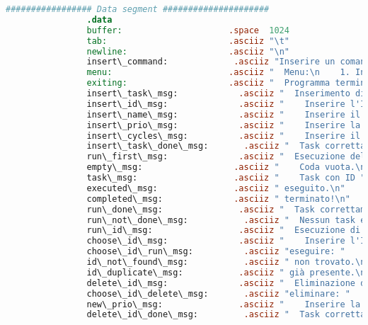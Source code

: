 \begin{center}
\begin{lstlisting}[language=mips, gobble=14, stepnumber=1]
                ################# Data segment #####################
                .data
                buffer:                     .space  1024
                tab:                        .asciiz "\t"
                newline:                    .asciiz "\n"
                insert\_command:             .asciiz "Inserire un comando (INVIO stampa il menu): "
                menu:                       .asciiz "  Menu:\n    1. Inserisci un nuovo task;\n    2. Esegui il task in testa alla coda;\n    3. Esegui un task specifico;\n    4. Elimina un task specifico;\n    5. Modifica la priorità di un task specifico;\n    6. Cambia politica di scheduling;\n    7. Termina il programma.\n\n"
                exiting:                    .asciiz "  Programma terminato."
                insert\_task\_msg:            .asciiz "  Inserimento di un nuovo task.\n"
                insert\_id\_msg:              .asciiz "    Inserire l'ID del task: "
                insert\_name\_msg:            .asciiz "    Inserire il nome del task (max 8 caratteri): "
                insert\_prio\_msg:            .asciiz "    Inserire la priorità del task (min 0, max 9): "
                insert\_cycles\_msg:          .asciiz "    Inserire il numero di cicli di CPU del task (min 1, max 99): "
                insert\_task\_done\_msg:       .asciiz "  Task correttamente inserito!\n\n"
                run\_first\_msg:              .asciiz "  Esecuzione del primo task.\n"
                empty\_msg:                  .asciiz "    Coda vuota.\n"
                task\_msg:                   .asciiz "    Task con ID "
                executed\_msg:               .asciiz " eseguito.\n"
                completed\_msg:              .asciiz " terminato!\n"
                run\_done\_msg:               .asciiz "  Task correttamente eseguito!\n\n"
                run\_not\_done\_msg:           .asciiz "  Nessun task eseguito!\n\n"
                run\_id\_msg:                 .asciiz "  Esecuzione di un task specifico.\n"
                choose\_id\_msg:              .asciiz "    Inserire l'ID del task da "
                choose\_id\_run\_msg:          .asciiz "eseguire: "
                id\_not\_found\_msg:           .asciiz " non trovato.\n"
                id\_duplicate\_msg:           .asciiz " già presente.\n"
                delete\_id\_msg:              .asciiz "  Eliminazione di un task specifico.\n"
                choose\_id\_delete\_msg:       .asciiz "eliminare: "
                new\_prio\_msg:               .asciiz "    Inserire la nuova priorità del task (min 0, max 9): "
                delete\_id\_done\_msg:         .asciiz "  Task correttamente eliminato!\n\n"

\end{lstlisting}
\end{center}
